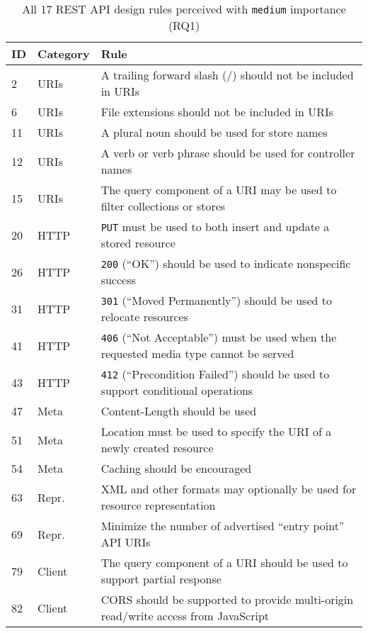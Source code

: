 \documentclass[runningheads]{llncs}
\begin{document}
\begin{table}
    \centering
	\caption{All 17 REST API design rules perceived with \texttt{medium} importance (RQ1)}
	\label{table:rulesMedium}
	\begin{tabular}{p{}>{\raggedright}p{}>{\raggedright\arraybackslash}p{}}
		
ID & Category                    & Rule                                                                 \\
\hline
\hline
2  & URIs      & A trailing forward slash (/) should not be included in URIs                        \\
6  & URIs      & File extensions should not be included in URIs                                     \\
11 & URIs      & A plural noun should be used for store names                                       \\
12 & URIs      & A verb or verb phrase should be used for controller names                          \\
15 & URIs      & The query component of a URI may be used to filter collections or stores           \\
20 & HTTP      & \texttt{PUT} must be used to both insert and update a stored resource                       \\
26 & HTTP      & \texttt{200} (\enquote{OK}) should be used to indicate nonspecific success                          \\
31 & HTTP      & \texttt{301} (\enquote{Moved Permanently}) should be used to relocate resources                     \\
41 & HTTP      & \texttt{406} (\enquote{Not Acceptable}) must be used when the requested media type cannot be served \\
43 & HTTP      & \texttt{412} (\enquote{Precondition Failed}) should be used to support conditional operations       \\
47 & Meta      & Content-Length should be used                                                      \\
51 & Meta      & Location must be used to specify the URI of a newly created resource               \\
54 & Meta      & Caching should be encouraged                                                       \\
63 & Repr.     & XML and other formats may optionally be used for resource representation           \\
69 & Repr.     & Minimize the number of advertised \enquote{entry point} API URIs                           \\
79 & Client    & The query component of a URI should be used to support partial response            \\
82 & Client    & CORS should be supported to provide multi-origin read/write access from JavaScript \\
\hline
	\end{tabular}
\end{table}
\end{document}
